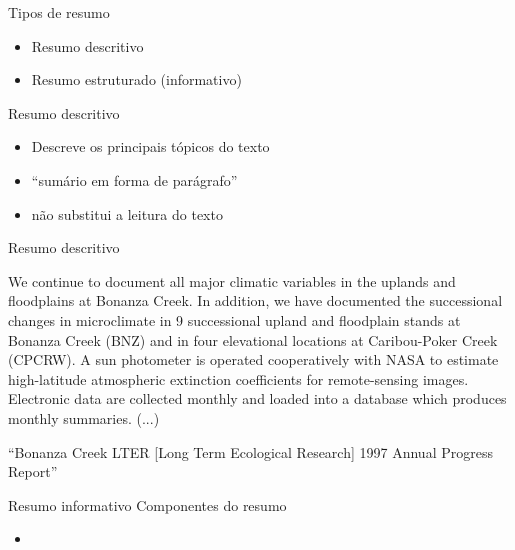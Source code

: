 \documentclass{beamer}
\begin{document}
\begin{frame}{Tipos de resumo}
  \begin{itemize}
  \item Resumo descritivo
  \item Resumo estruturado (informativo)
  \end{itemize}
\end{frame}

\begin{frame}{Resumo descritivo}
  \begin{itemize}
  \item Descreve os principais tópicos do texto
  \item ``sumário em forma de parágrafo''
  \item não substitui a leitura do texto
  \end{itemize}
\end{frame}

\begin{frame}{Resumo descritivo}
  \begin{example}



    We continue to document all major climatic variables in the
    uplands and floodplains at Bonanza Creek. In addition, we have
    documented the successional changes in microclimate in 9
    successional upland and floodplain stands at Bonanza Creek (BNZ)
    and in four elevational locations at Caribou-Poker Creek
    (CPCRW). A sun photometer is operated cooperatively with NASA to
    estimate high-latitude atmospheric extinction coefficients for
    remote-sensing images. Electronic data are collected monthly and
    loaded into a database which produces monthly summaries.  (...)

  \end{example}
  ``Bonanza Creek LTER [Long Term Ecological Research] 1997 Annual
  Progress Report''

\end{frame}

\begin{frame}{Resumo informativo}
Componentes do resumo
  \begin{itemize}
  \item 
  \end{itemize}
\end{frame}
\end{document}

